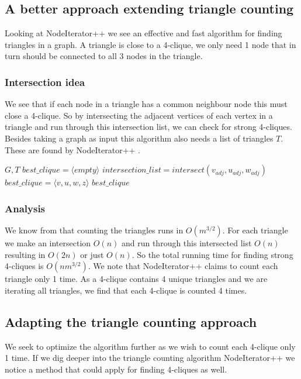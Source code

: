 \documentclass{article}
\begin{document}
\subsection{A better approach extending triangle counting}
Looking at NodeIterator++ \cite{countingTriangles} we see an effective and fast algorithm for finding triangles in a graph. A triangle is close to a 4-clique, we only need 1 node that in turn should be connected to all 3 nodes in the triangle.

\subsubsection{Intersection idea}
We see that if each node in a triangle has a common neighbour node this must close a 4-clique. So by intersecting the adjacent vertices of each vertex in a triangle and run through this intersection list, we can check for strong 4-cliques. Besides taking a graph as input this algorithm also needs a list of triangles $T$. These are found by NodeIterator++ \cite{countingTriangles}.

\begin{algorithm}
\label{strong_clique_p}
\caption{$strong\_4clique\_finder+$}
\begin{algorithmic}
\REQUIRE $G,T$
\STATE $best\_clique = \langle empty\rangle $
	\STATE $intersection\_list = intersect(v_{adj}, u_{adj}, w_{adj})$
				\STATE $best\_clique = \langle v,u,w,z\rangle $
			\ENDIF
		\ENDFOR
	\ENDIF
\ENDFOR
\RETURN $best\_clique$
\end{algorithmic}
\end{algorithm}

\subsubsection{Analysis}
We know from \cite{countingTriangles} that counting the triangles runs in $O(m^{3/2})$. For each triangle we make an intersection $O(n)$ and run through this intersected list $O(n)$ resulting in $O(2n)$ or just $O(n)$. So the total running time for finding strong 4-cliques is $O(nm^{3/2})$. We note that NodeIterator++ claims to count each triangle only 1 time. As a 4-clique contains 4 unique triangles and we are iterating all triangles, we find that each 4-clique is counted 4 times.

\subsection{Adapting the triangle counting approach}
We seek to optimize the algorithm further as we wish to count each 4-clique only 1 time. If we dig deeper into the triangle counting algorithm NodeIterator++ \cite{countingTriangles} we notice a method that could apply for finding 4-cliques as well.
\end{document}
